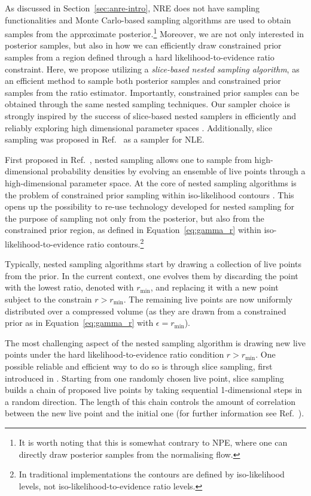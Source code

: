  As discussed in Section~\ref{sec:anre-intro}, NRE does not have sampling functionalities and Monte Carlo-based sampling algorithms are used to obtain samples from the approximate posterior.\footnote{It is worth noting that this is somewhat contrary to NPE, where one can directly draw posterior samples from the normalising flow.} Moreover, we are not only interested in posterior samples, but also in how we can efficiently draw constrained prior samples from a region defined through a hard likelihood-to-evidence ratio constraint. Here, we propose utilizing a \emph{slice-based nested sampling algorithm}, as an efficient method to sample both posterior samples and constrained prior samples from the ratio estimator. Importantly, constrained prior samples can be obtained through the same nested sampling techniques. Our sampler choice is strongly inspired by the success of slice-based nested samplers in efficiently and reliably exploring high dimensional parameter spaces \cite{Handley:2015fda, Handley:2015fda}. Additionally, slice sampling was proposed in Ref.~\cite{Papamakarios:2018aa} as a sampler for NLE. 

First proposed in Ref.~\cite{Skilling:2006gxv}, nested sampling allows one to sample from high-dimensional probability densities by evolving an ensemble of live points through a high-dimensional parameter space. At the core of nested sampling algorithms is the problem of constrained prior sampling within iso-likelihood contours \cite{Ashton:2022grj}. This opens up the possibility to re-use technology developed for nested sampling for the purpose of sampling not only from the posterior, but also from the constrained prior region, as defined in Equation~\eqref{eq:gamma_r} within iso-likelihood-to-evidence ratio contours.\footnote{In traditional implementations the contours are defined by iso-likelihood levels, not iso-likelihood-to-evidence ratio levels.}

Typically, nested sampling algorithms start by drawing a collection of live points from the prior. In the current context, one evolves them by discarding the point with the lowest ratio, denoted with $r_\mathrm{min}$, and replacing it with a new point subject to the constrain $r > r_\mathrm{min}$. The remaining live points are now uniformly distributed over a compressed volume (as they are drawn from a constrained prior as in Equation~\eqref{eq:gamma_r} with $\epsilon = r_\mathrm{min}$).

The most challenging aspect of the nested sampling algorithm is drawing new live points under the hard likelihood-to-evidence ratio condition $r > r_\mathrm{min}$. One possible reliable and efficient way to do so is through slice sampling, first introduced in \cite{Neal:aa}. Starting from one randomly chosen live point, slice sampling builds a chain of proposed live points by taking sequential 1-dimensional steps in a random direction. The length of this chain controls the amount of correlation between the new live point and the initial one (for further information see Ref.~\cite{Buchner:2021kpm}).


